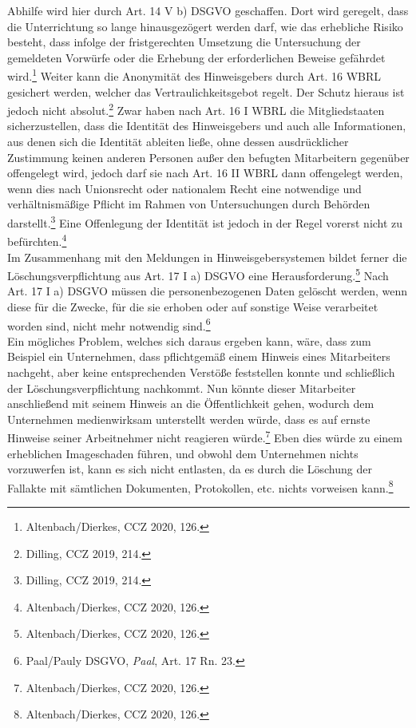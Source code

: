 Abhilfe wird hier durch Art. 14 V b) DSGVO geschaffen.
Dort wird geregelt, dass die Unterrichtung so lange hinausgezögert werden darf, wie das erhebliche Risiko besteht, dass infolge der fristgerechten Umsetzung die Untersuchung der gemeldeten Vorwürfe oder die Erhebung der erforderlichen Beweise gefährdet wird.\footnote{Altenbach/Dierkes, CCZ 2020, 126.}
Weiter kann die Anonymität des Hinweisgebers durch Art. 16 WBRL gesichert werden, welcher das Vertraulichkeitsgebot regelt. 
Der Schutz hieraus ist jedoch nicht absolut.\footnote{Dilling, CCZ 2019, 214.}
Zwar haben nach Art. 16 I WBRL die Mitgliedstaaten sicherzustellen, dass die Identität des Hinweisgebers und auch alle Informationen, aus denen sich die Identität ableiten ließe, ohne dessen ausdrücklicher Zustimmung keinen anderen Personen außer den befugten Mitarbeitern gegenüber offengelegt wird, jedoch darf sie nach Art. 16 II WBRL dann offengelegt werden, wenn dies nach Unionsrecht oder nationalem Recht eine notwendige und verhältnismäßige Pflicht im Rahmen von Untersuchungen durch Behörden darstellt.\footnote{Dilling, CCZ 2019, 214.}
Eine Offenlegung der Identität ist jedoch in der Regel vorerst nicht zu befürchten.\footnote{Altenbach/Dierkes, CCZ 2020, 126.}\\
Im Zusammenhang mit den Meldungen in Hinweisgebersystemen bildet  ferner die Löschungsverpflichtung aus Art. 17 I a) DSGVO eine Herausforderung.\footnote{Altenbach/Dierkes, CCZ 2020, 126.}
Nach Art. 17 I a) DSGVO müssen die personenbezogenen Daten gelöscht werden, wenn diese für die Zwecke, für die sie erhoben oder auf sonstige Weise verarbeitet worden sind, nicht mehr notwendig sind.\footnote{Paal/Pauly DSGVO, \textit{Paal}, Art. 17 Rn. 23.}\\
Ein mögliches Problem, welches sich daraus ergeben kann, wäre, dass zum Beispiel ein Unternehmen, dass pflichtgemäß einem Hinweis eines Mitarbeiters nachgeht, aber keine entsprechenden Verstöße feststellen konnte und schließlich der Löschungsverpflichtung nachkommt. 
Nun könnte dieser Mitarbeiter anschließend mit seinem Hinweis an die Öffentlichkeit gehen, wodurch dem Unternehmen medienwirksam unterstellt werden würde, dass es auf ernste Hinweise seiner Arbeitnehmer nicht reagieren würde.\footnote{Altenbach/Dierkes, CCZ 2020, 126.}
Eben dies würde zu einem erheblichen Imageschaden führen, und obwohl dem Unternehmen nichts vorzuwerfen ist, kann es sich nicht entlasten, da es durch die Löschung der Fallakte mit sämtlichen Dokumenten, Protokollen, etc. nichts vorweisen kann.\footnote{Altenbach/Dierkes, CCZ 2020, 126.}\\
